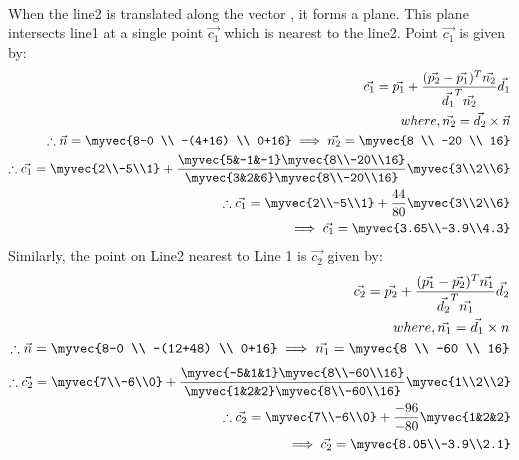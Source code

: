 \documentclass[journal,12pt,twocolumn]{IEEEtran}
\begin{document}
\\
When the line2 is translated along the vector , it forms a plane. This plane intersects line1 at a single point $\vec{c_1}$ which is nearest to the line2. Point $\vec{c_1}$ is given by:
\\
\begin{align}
\vec{c_1}=\vec{p_1}+\frac{(\vec{p_2}-\vec{p_1})^T \vec{n_2}}{\vec{d_1}^T \vec{n_2}}\vec{d_1} \\
where, \vec{n_2}=\vec{d_2}\times \vec{n}\\
 \therefore \vec{n}=\myvec{8-0 \\ -(4+16) \\ 0+16}
\implies \vec{n_2}=\myvec{8 \\ -20 \\ 16}\\
\therefore \vec{c_1}= \myvec{2\\-5\\1}+\frac{\myvec{5&-1&-1} \myvec{8\\-20\\16}}{\myvec{3&2&6} \myvec{8\\-20\\16}}\myvec{3\\2\\6}\\
\therefore \vec{c_1}= \myvec{2\\-5\\1}+\frac{44}{80}\myvec{3\\2\\6}\\
\implies \vec{c_1}=\myvec{3.65\\-3.9\\4.3}
\end{align}
Similarly, the point on Line2 nearest to Line 1 is $\vec{c_2}$ given by:\\
\begin{align}
\vec{c_2}=\vec{p_2}+\frac{(\vec{p_1}-\vec{p_2})^T \vec{n_1}}{\vec{d_2}^T \vec{n_1}}\vec{d_2} \\
where, \vec{n_1}=\vec{d_1}\times n\\
 \therefore \vec{n}=\myvec{8-0 \\ -(12+48) \\ 0+16}
\implies \vec{n_1}=\myvec{8 \\ -60 \\ 16}
\end{align}
\begin{align}
\therefore \vec{c_2}= \myvec{7\\-6\\0}+\frac{\myvec{-5&1&1} \myvec{8\\-60\\16}}{\myvec{1&2&2} \myvec{8\\-60\\16}}\myvec{1\\2\\2}\\
\therefore \vec{c_2}= \myvec{7\\-6\\0}+\frac{-96}{-80}\myvec{1&2&2}\\
\implies \vec{c_2}=\myvec{8.05\\-3.9\\2.1}
\end{align}
\end{document}
